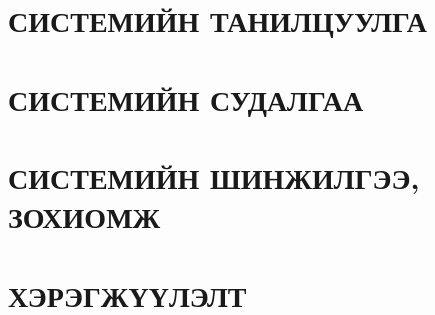\chapter{СИСТЕМИЙН ТАНИЛЦУУЛГА}


\chapter{СИСТЕМИЙН СУДАЛГАА}


\chapter{СИСТЕМИЙН ШИНЖИЛГЭЭ, ЗОХИОМЖ}


\chapter{ХЭРЭГЖҮҮЛЭЛТ}


% 


